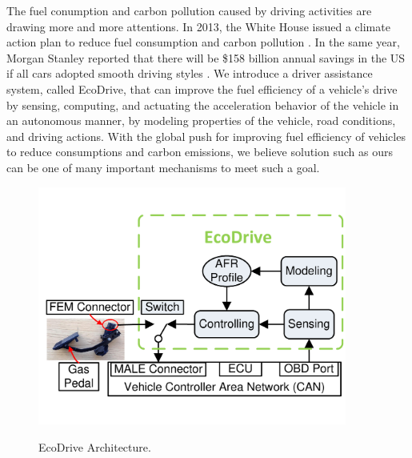 

The fuel conumption and carbon pollution caused by 
driving activities are drawing more and more attentions. 
In 2013, the White House issued a climate action plan to reduce fuel consumption
and carbon pollution \cite{whitehouse2013}. 
In the same year, Morgan Stanley reported that 
there will be \$158 billion annual savings in the US 
if all cars adopted smooth driving styles \cite{morganstanley2013}. 
We introduce a driver assistance system, called EcoDrive, 
that can improve the fuel efficiency of a vehicle's drive by sensing, computing, 
and actuating the acceleration behavior of the vehicle in an autonomous manner, 
by modeling properties of the vehicle, road conditions, and driving actions. 
With the global push for improving fuel efficiency of vehicles to 
reduce consumptions and carbon emissions, 
we believe solution such as ours can be one of many important mechanisms to meet such a goal.


\begin{figure}[t]
\begin{center}
\vspace{-0.5cm}
\includegraphics[width=4.0in,angle=0]{Figs/EcoDrive/architecture.pdf}
\vspace{-0.5cm}
\caption{EcoDrive Architecture.}
\vspace{-0.7cm}
\label{ecodrive}
\end{center}
\end{figure}


